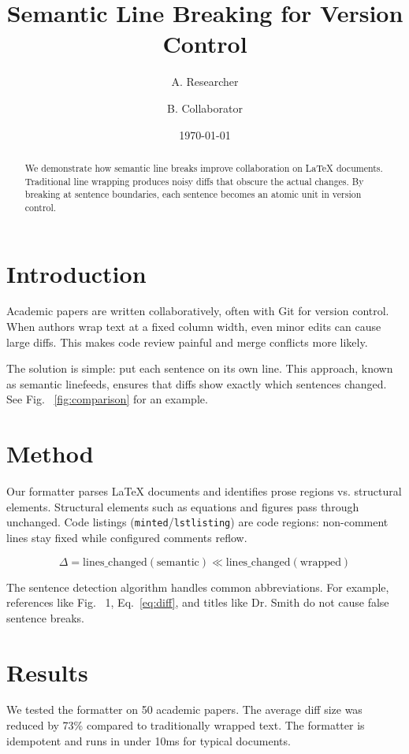 \documentclass{article}
\title{Semantic Line Breaking for Version Control}
\author{A. Researcher \and B. Collaborator}
\date{\today}
\begin{document}
\maketitle

\begin{abstract} We demonstrate how semantic line breaks improve collaboration on LaTeX documents.
Traditional line wrapping produces noisy diffs that obscure the actual changes.
By breaking at sentence boundaries, each sentence becomes an atomic unit in version control.
\end{abstract}

\section{Introduction}

Academic papers are written collaboratively, often with Git for version control.
When authors wrap text at a fixed column width, even minor edits can cause large diffs.
This makes code review painful and merge conflicts more likely.

The solution is simple: put each sentence on its own line.
This approach, known as semantic linefeeds, ensures that diffs show exactly which sentences changed.
See Fig. ~\ref{fig:comparison} for an example.

\section{Method}

Our formatter parses LaTeX documents and identifies prose regions vs. structural elements.
Structural elements such as equations and figures pass through unchanged.
Code listings (\texttt{minted}/\texttt{lstlisting}) are code regions: non-comment lines stay fixed while configured comments reflow.

\begin{equation}
\label{eq:diff}
\Delta = \text{lines\_changed}(\text{semantic}) \ll \text{lines\_changed}(\text{wrapped})
\end{equation}


The sentence detection algorithm handles common abbreviations.
For example, references like Fig. ~1, Eq.~\ref{eq:diff}, and titles like Dr. Smith do not cause false sentence breaks.

\section{Results}

We tested the formatter on 50 academic papers.
The average diff size was reduced by 73\% compared to traditionally wrapped text.
The formatter is idempotent and runs in under 10ms for typical documents.
\end{document}
